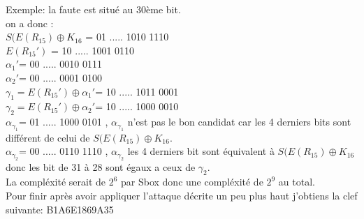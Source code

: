 \documentclass[a4paper,10pt]{report}
\begin{document}
			Exemple: la faute est situé au 30ème bit.\\
			
			on a donc :\\
			$S(E(R_{15})\oplus K_{16}$ = 01 ..... 1010 1110\\
			$E(R_{15}')$ = 10 ..... 1001 0110\\
			$\alpha_1'$= 00 ..... 0010 0111\\
			$\alpha_2'$= 00 ..... 0001 0100\\
			$\gamma_1=E(R_{15}')\oplus \alpha_1'$= 10 ..... 1011 0001\\
			$\gamma_2=E(R_{15}')\oplus \alpha_2'$= 10 ..... 1000 0010\\
			$\alpha_{\gamma_1}$= 01 ..... 1000 0101 , $\alpha_{\gamma_1}$ n'est pas le bon candidat car les 4 derniers bits sont différent de celui de $S(E(R_{15})\oplus K_{16}$.\\
			$\alpha_{\gamma_2}$= 00 ..... 0110 1110 , $\alpha_{\gamma_2}$ les 4 derniers bit sont équivalent à $S(E(R_{15})\oplus K_{16}$ donc les bit de 31 à 28 sont égaux a ceux de $\gamma_2$.\\
			
			La compléxité serait de $2^{6}$ par Sbox donc une compléxité de $2^{9}$ au total.\\
			Pour finir après avoir appliquer l'attaque décrite un peu plus haut j'obtiens la clef suivante: B1A6E1869A35
\end{document}

